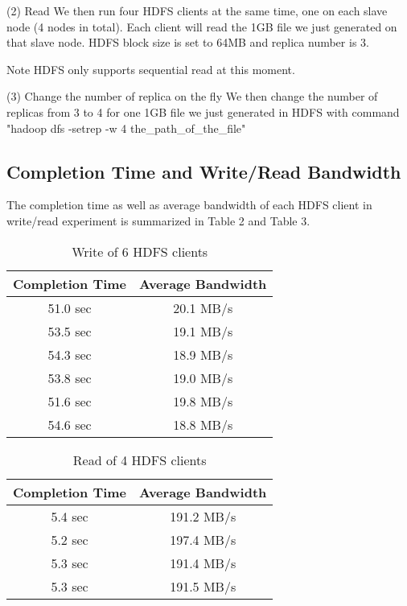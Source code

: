 (2) Read
We then run four HDFS clients at the same time, one on each slave node (4 nodes in total). Each client will read the 1GB file we just generated on that slave node. HDFS block size is set to 64MB and replica number is 3.

Note HDFS only supports sequential read at this moment.

(3) Change the number of replica on the fly
We then change the number of replicas from 3 to 4 for one 1GB file we just generated in HDFS with command "hadoop dfs -setrep -w 4 the\_path\_of\_the\_file"

\subsection{\bf Completion Time and Write/Read Bandwidth}

The completion time as well as average bandwidth of each HDFS client in write/read experiment is summarized in Table 2 and Table 3.

\begin{table}[!htpb]
\centering
\begin{tabular}{|c|c|} \hline
Completion Time & Average Bandwidth\\ \hline
51.0 sec & 20.1 MB/s\\ \hline
53.5 sec & 19.1 MB/s\\ \hline
54.3 sec & 18.9 MB/s\\ \hline
53.8 sec & 19.0 MB/s\\ \hline
51.6 sec & 19.8 MB/s\\ \hline
54.6 sec & 18.8 MB/s\\ \hline
\end{tabular}\label{t1}
\caption{Write of 6 HDFS clients}
\end{table}

\begin{table}[!htpb]
\centering
\begin{tabular}{|c|c|} \hline
Completion Time & Average Bandwidth\\ \hline
5.4 sec & 191.2 MB/s\\ \hline
5.2 sec & 197.4 MB/s\\ \hline
5.3 sec & 191.4 MB/s\\ \hline
5.3 sec & 191.5 MB/s\\ \hline
\end{tabular}\label{t1}
\caption{Read of 4 HDFS clients}
\end{table}



